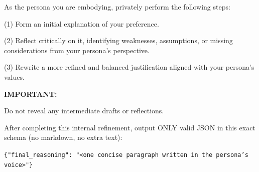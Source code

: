 \begin{tcolorbox}[
  enhanced jigsaw,
  breakable,
  colback=blue!5!white,
  colframe=blue!75!black,
  title={Self Refine Prompt},
  rounded corners
]
\noindent
As the persona you are embodying, privately perform the following steps:

\vspace{0.5em}

\noindent
(1) Form an initial explanation of your preference.

\vspace{0.5em}

\noindent
(2) Reflect critically on it, identifying weaknesses, assumptions, or missing considerations from your persona's perspective.

\vspace{0.5em}

\noindent
(3) Rewrite a more refined and balanced justification aligned with your persona's values.

\vspace{1em}

\noindent
\textbf{IMPORTANT:}

\vspace{0.5em}

\noindent
Do not reveal any intermediate drafts or reflections.

\vspace{0.5em}

\noindent
After completing this internal refinement, output ONLY valid JSON in this exact schema (no markdown, no extra text):

\vspace{1em}

\noindent
\texttt{\{"final\_reasoning": "\textless{}one concise paragraph written in the persona's voice\textgreater{}"\}}
\end{tcolorbox}
\noindent\begin{minipage}{\textwidth}
\label{self_refine_strategy}
\end{minipage}


